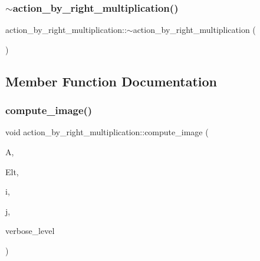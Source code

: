 \subsubsection{\texorpdfstring{$\sim$action\+\_\+by\+\_\+right\+\_\+multiplication()}{~action\_by\_right\_multiplication()}}
{\footnotesize\ttfamily action\+\_\+by\+\_\+right\+\_\+multiplication\+::$\sim$action\+\_\+by\+\_\+right\+\_\+multiplication (\begin{DoxyParamCaption}{ }\end{DoxyParamCaption})}



\subsection{Member Function Documentation}
\mbox{\label{classaction__by__right__multiplication_a5407ada4c7d5a1775144fbaadbb8be8e}} 
\subsubsection{\texorpdfstring{compute\+\_\+image()}{compute\_image()}}
{\footnotesize\ttfamily void action\+\_\+by\+\_\+right\+\_\+multiplication\+::compute\+\_\+image (\begin{DoxyParamCaption}\item[{\mbox{\hyperlink{classaction}{action}} $\ast$}]{A,  }\item[{\mbox{\hyperlink{galois_8h_a09fddde158a3a20bd2dcadb609de11dc}{I\+NT}} $\ast$}]{Elt,  }\item[{\mbox{\hyperlink{galois_8h_a09fddde158a3a20bd2dcadb609de11dc}{I\+NT}}}]{i,  }\item[{\mbox{\hyperlink{galois_8h_a09fddde158a3a20bd2dcadb609de11dc}{I\+NT}} \&}]{j,  }\item[{\mbox{\hyperlink{galois_8h_a09fddde158a3a20bd2dcadb609de11dc}{I\+NT}}}]{verbose\+\_\+level }\end{DoxyParamCaption})}

\mbox{\label{classaction__by__right__multiplication_a21d1c5373681ad7405d9ac8fec4e9aac}} 
